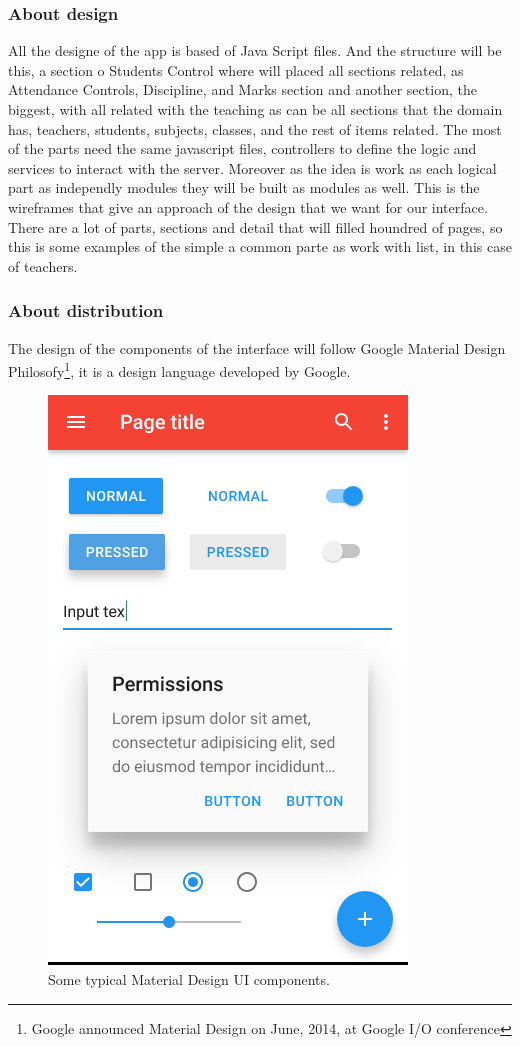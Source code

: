 \subsubsection{About design}

All the designe of the app is based of Java Script files. And the structure will
be this,  a section o Students Control where will placed all sections related,
as Attendance Controls, Discipline, and Marks section and another section, the
biggest, with all related with the teaching as can be all sections that the domain
has, teachers, students, subjects, classes, and the rest of items related.
\intro
The most of the parts need the same javascript files, controllers to define the
logic and services to interact with the server. Moreover as the idea is work as
each logical part as independly modules they will be built as modules as well.
\intro
This is the wireframes that give an approach of the design that we want for
our interface. There are a lot of parts, sections and detail that will
filled houndred of pages, so this is some examples of the simple a common
parte as work with list, in this case of teachers.

\subsubsection{About distribution}

The design of the components of the interface will follow
Google Material Design Philosofy\footnote{Google announced Material Design on
June, 2014, at Google I/O conference}, it is a design language developed by
Google.

\begin{figure}[H]
  \includegraphics[scale=0.4]{img/graphics/MaterialDesign.png}
  \centering
  \caption{Some typical Material Design UI components.}
\end{figure}

